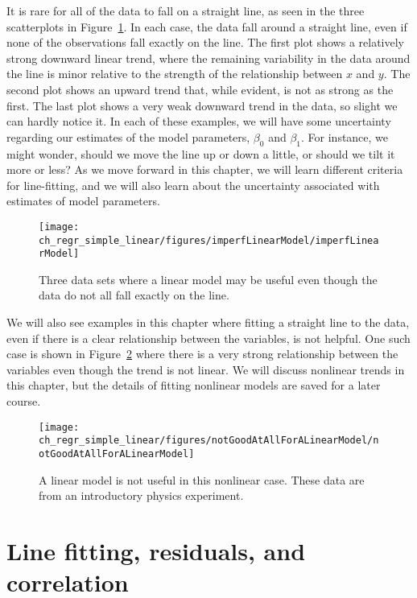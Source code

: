 It is rare for all of the data to fall on a straight line,
as seen in the three scatterplots in
Figure~\ref{imperfLinearModel}.
In each case, the data fall around a straight line,
even if none of the observations fall exactly on the line.
The first plot shows a relatively strong downward
linear trend,
where the remaining variability in the data around the
line is minor relative to the strength of the relationship
between $x$ and $y$.
The second plot shows an upward trend that,
while evident, is not as strong as the first.
The last plot shows a very weak downward trend in the data,
so slight we can hardly notice it.
In each of these examples,
we will have some uncertainty regarding our estimates
of the model parameters, $\beta_0$ and $\beta_1$.
For instance, we might wonder, should we move the line
up or down a little, or should we tilt it more or less?
As we move forward in this chapter,
we will learn different criteria for line-fitting,
and we will also learn about the uncertainty associated
with estimates of model parameters.

\begin{figure}
   \centering
   \texttt{[image: ch\_regr\_simple\_linear/figures/imperfLinearModel/imperfLinearModel]}
   \caption{Three data sets where a linear model may be useful even though the data do not all fall exactly on the line.}
   \label{imperfLinearModel}
\end{figure}

We will also see examples in this chapter where fitting a straight line to the data, even if there is a clear relationship between the variables, is not helpful. One such case is shown in Figure~\ref{notGoodAtAllForALinearModel} where there is a very strong relationship between the variables even though the trend is not linear. We will discuss nonlinear trends in this chapter, but the details of fitting nonlinear models are saved for a later course.

\begin{figure}
   \centering
   \texttt{[image: ch\_regr\_simple\_linear/figures/notGoodAtAllForALinearModel/notGoodAtAllForALinearModel]}
   \caption{A linear model is not useful in this nonlinear case. These data are from an introductory physics experiment.}
   \label{notGoodAtAllForALinearModel}
\end{figure}





\section[Line fitting, residuals, and correlation]{Line fitting, residuals, and correlation ~}
\label{lineFittingResidualsCorrelation}

